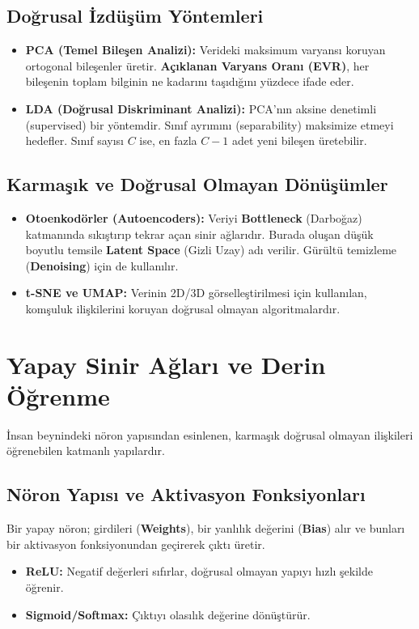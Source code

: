 \documentclass[12pt,a4paper]{article}
\begin{document}
\subsection{Doğrusal İzdüşüm Yöntemleri}
\begin{itemize}
    \item \textbf{PCA (Temel Bileşen Analizi):} Verideki maksimum varyansı koruyan ortogonal bileşenler üretir. \textbf{Açıklanan Varyans Oranı (EVR)}, her bileşenin toplam bilginin ne kadarını taşıdığını yüzdece ifade eder.
    \item \textbf{LDA (Doğrusal Diskriminant Analizi):} PCA'nın aksine denetimli (supervised) bir yöntemdir. Sınıf ayrımını (separability) maksimize etmeyi hedefler. Sınıf sayısı $C$ ise, en fazla $C-1$ adet yeni bileşen üretebilir.
\end{itemize}

\subsection{Karmaşık ve Doğrusal Olmayan Dönüşümler}
\begin{itemize}
    \item \textbf{Otoenkodörler (Autoencoders):} Veriyi \textbf{Bottleneck} (Darboğaz) katmanında sıkıştırıp tekrar açan sinir ağlarıdır. Burada oluşan düşük boyutlu temsile \textbf{Latent Space} (Gizli Uzay) adı verilir. Gürültü temizleme (\textbf{Denoising}) için de kullanılır.
    \item \textbf{t-SNE ve UMAP:} Verinin 2D/3D görselleştirilmesi için kullanılan, komşuluk ilişkilerini koruyan doğrusal olmayan algoritmalardır.
\end{itemize}

\newpage
\section{Yapay Sinir Ağları ve Derin Öğrenme}
İnsan beynindeki nöron yapısından esinlenen, karmaşık doğrusal olmayan ilişkileri öğrenebilen katmanlı yapılardır.

\subsection{Nöron Yapısı ve Aktivasyon Fonksiyonları}
Bir yapay nöron; girdileri (\textbf{Weights}), bir yanlılık değerini (\textbf{Bias}) alır ve bunları bir aktivasyon fonksiyonundan geçirerek çıktı üretir.
\begin{itemize}
    \item \textbf{ReLU:} Negatif değerleri sıfırlar, doğrusal olmayan yapıyı hızlı şekilde öğrenir.
    \item \textbf{Sigmoid/Softmax:} Çıktıyı olasılık değerine dönüştürür.
\end{itemize}
\end{document}
